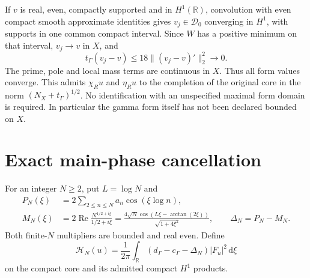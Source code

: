 \documentclass[11pt]{article}
\theoremstyle{remark}\newtheorem{remark}[theorem]{Remark}
\newcommand{\R}{\mathbb R}
\newcommand{\dd}{\,\mathrm d}
\newcommand{\norm}[1]{\lVert#1\rVert}
\newcommand{\HH}{\mathcal H}
\numberwithin{equation}{section}
\begin{document}
If $v$ is real, even, compactly supported and in $H^1(\R)$, convolution
with even compact smooth approximate identities gives $v_j\in\mathcal D_0$
converging in $H^1$, with supports in one common compact interval. Since
$W$ has a positive minimum on that interval, $v_j\to v$ in $X$, and
\begin{equation}\label{eq:admission}
 t_\Gamma(v_j-v)\le18\norm{(v_j-v)'}_2^2\longrightarrow0.
\end{equation}
The prime, pole and local mass terms are continuous in $X$. Thus all form
values converge. This admits $\chi_Ru$ and $\eta_Ru$ to the completion of
the original core in the norm $(N_X+t_\Gamma)^{1/2}$. No identification
with an unspecified maximal form domain is required. In particular the
gamma form itself has not been declared bounded on $X$.

\section{Exact main-phase cancellation}\label{sec:phase}

For an integer $N\ge2$, put $L=\log N$ and
\begin{align}
 P_N(\xi)&=2\sum_{2\le n\le N}a_n\cos(\xi\log n),\label{eq:PN}\\
 M_N(\xi)&=2\operatorname{Re}\frac{N^{1/2+i\xi}}{1/2+i\xi}
 =\frac{4\sqrt N\cos(L\xi-\arctan(2\xi))}{\sqrt{1+4\xi^2}},
 \qquad\Delta_N=P_N-M_N.\label{eq:MN}
\end{align}
Both finite-$N$ multipliers are bounded and real even. Define
\begin{equation}\label{eq:renormalized}
 \HH_N(u)=\frac1{2\pi}\int_\R
       (d_\Gamma-c_\Gamma-\Delta_N)|F_u|^2\dd\xi
\end{equation}
on the compact core and its admitted compact $H^1$ products.
\end{document}
